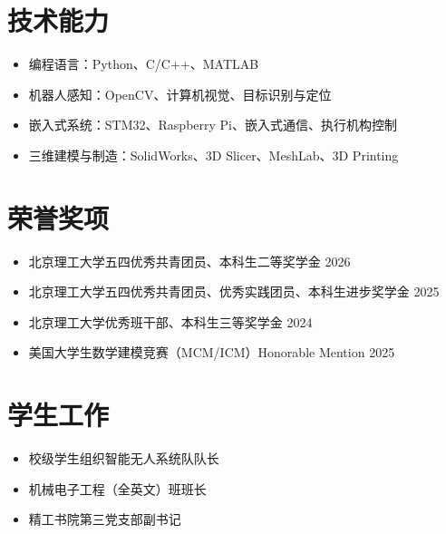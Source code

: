 \documentclass[10pt,a4paper]{article}
\begin{document}
\section{技术能力}

\begin{itemize}

\item
编程语言：Python、C/C++、MATLAB

\item
机器人感知：OpenCV、计算机视觉、目标识别与定位

\item
嵌入式系统：STM32、Raspberry Pi、嵌入式通信、执行机构控制

\item
三维建模与制造：SolidWorks、3D Slicer、MeshLab、3D Printing

\end{itemize}




\section{荣誉奖项}

\begin{itemize}[leftmargin=1.5em]

\item 北京理工大学五四优秀共青团员、本科生二等奖学金
\hfill 2026

\item 北京理工大学五四优秀共青团员、优秀实践团员、本科生进步奖学金
\hfill 2025

\item 北京理工大学优秀班干部、本科生三等奖学金
\hfill 2024

\item 美国大学生数学建模竞赛（MCM/ICM）Honorable Mention
\hfill 2025

\end{itemize}



\section{学生工作}

\begin{itemize}

\item
校级学生组织智能无人系统队队长

\item
机械电子工程（全英文）班班长

\item
精工书院第三党支部副书记

\end{itemize}
\end{document}

